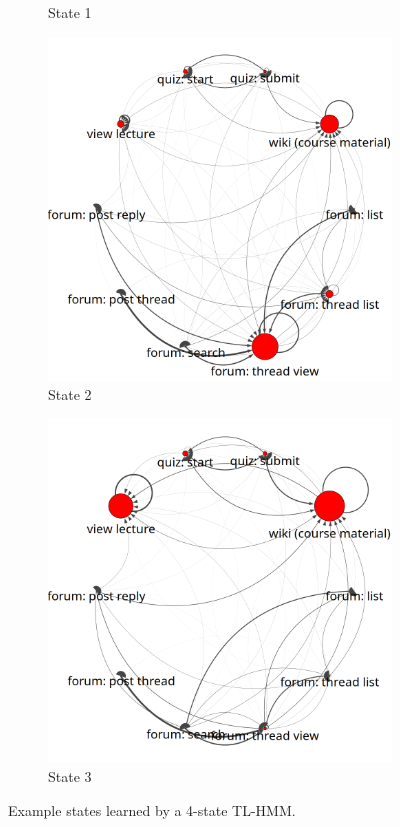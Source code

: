 \begin{figure}
\begin{subfigure}[t]{0.24\textwidth}
    \caption{\label{fig:state1}State 1}
  \end{subfigure}
  \begin{subfigure}[t]{0.24\textwidth}
    \includegraphics[width=\textwidth]{../figures/text-4state/state2.png}
    \caption{\label{fig:state2}State 2}
  \end{subfigure}
  \begin{subfigure}[t]{0.24\textwidth}
    \includegraphics[width=\textwidth]{../figures/text-4state/state3.png}
    \caption{\label{fig:state3}State 3}
  \end{subfigure}
  \caption{Example states learned by a 4-state TL-HMM.}
  \label{fig:states}
\end{figure}

